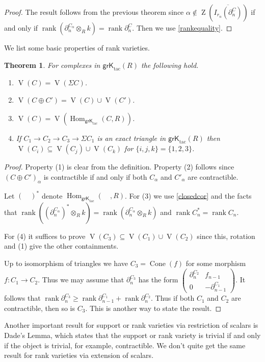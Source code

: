 \documentclass{amsart}[11pt]
\newcommand{\rank}{\operatorname{rank}}
\newcommand{\Cone}{\operatorname{Cone}}
\newcommand{\Hom}{\operatorname{Hom}}
\newcommand{\V}{\operatorname{V}}
\newcommand{\Z}{\operatorname{Z}}
\newcommand{\grKtac}{\operatorname{\mathsf{grK}_{tac}}\nolimits}
\numberwithin{equation}{section}
\theoremstyle{plain}
\newtheorem{theorem}{Theorem}[section]
\newtheorem*{Main Theorem}{Main Theorem}
\theoremstyle{definition}
\theoremstyle{remark}
\numberwithin{equation}{theorem}
\begin{document}
\begin{proof} The result follows from the previous theorem since 
$\alpha\notin\Z\left(\overline{I_{r_n}(\partial^C_n)}\right)$ if and only if
$\rank(\partial^{C_\alpha}_n\otimes_Rk)=\rank\partial^C_n$. Then we use \ref{rankequality}.
\end{proof}

We list some basic properties of rank varieties.

\begin{theorem}\label{properties} For complexes in $\grKtac(R)$ the following hold.
\begin{enumerate}
\item $\V(C)=\V(\Sigma C)$.
\item $\V(C\oplus C')=\V(C)\cup\V(C')$.
\item $\V(C)=\V(\Hom_{\grKtac}(C,R))$.
\item If $C_1\to C_2\to C_3\to \Sigma C_1$ is an exact triangle in $\grKtac(R)$ then
$\V(C_i)\subseteq \V(C_j)\cup\V(C_k)$ for $\{i,j,k\}=\{1,2,3\}$.
\end{enumerate}
\end{theorem}

\begin{proof} Property (1) is clear from the definition. Property (2) follows since $(C\oplus C')_\alpha$ is contractible if and only if both $C_\alpha$ and $C'_\alpha$ are contractible.

Let $(\quad)^*$ denote $\Hom_{\grKtac}(\quad,R)$. For (3) we use \ref{closedcor} and the facts that 
$\rank((\partial^{C_\alpha}_n)^*\otimes_Rk)=\rank(\partial^{C_\alpha}_n\otimes_Rk)$ and 
$\rank C_n^*=\rank C_n$.

For (4) it suffices to prove $\V(C_3)\subseteq\V(C_1)\cup\V(C_2)$ since this, rotation and (1) give the other containments.  

Up to isomorphism of triangles we have $C_3=\Cone(f)$ for some morphism $f:C_1\to C_2$. Thus we may assume that $\partial_n^{C_3}$ has the form $\left(\begin{array}{cc} \partial_n^{C_2} & f_{n-1}\\ 0 & -\partial_{n-1}^{C_1}\end{array}\right)$. It follows that $\rank\partial_n^{C_3}\ge\rank\partial_{n-1}^{C_1}+\rank\partial_n^{C_2}$. Thus if both $C_1$ and $C_2$ are contractible, then so is $C_3$. This is another way to state the result.
\end{proof}

Another important result for support or rank varieties via restriction of scalars is Dade's Lemma, which states that the support or rank variety is trivial if and only if the object is trivial, for example, contractible. We don't quite get the same result for rank varieties via extension of scalars.
\end{document}
